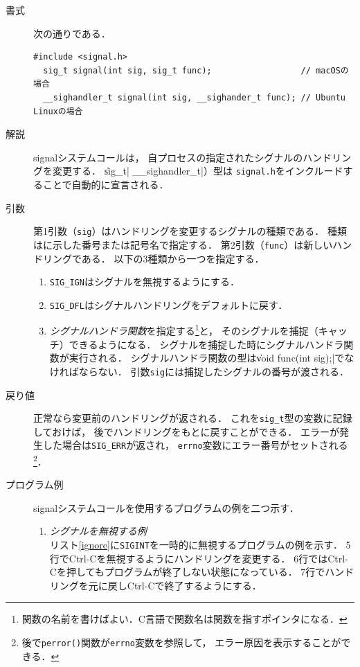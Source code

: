\begin{description}
\item[書式] 次の通りである．
\begin{lstlisting}[numbers=none]
  #include <signal.h>
  sig_t signal(int sig, sig_t func);                  // macOSの場合
  __sighandler_t signal(int sig, __sighander_t func); // Ubuntu Linuxの場合
\end{lstlisting}

\item[解説]
  signalシステムコールは，
  自プロセスの指定されたシグナルのハンドリングを変更する．
  \|sig_t|（\|__sighandler_t|）型は
  \texttt{signal.h}をインクルードすることで自動的に宣言される．

\item[引数]
  第1引数（\texttt{sig}）はハンドリングを変更するシグナルの種類である．
  種類はに示した番号または記号名で指定する．
  第2引数（\texttt{func}）は新しいハンドリングである．
  以下の3種類から一つを指定する．

  \begin{enumerate}
  \item \texttt{SIG\_IGN}はシグナルを無視するようにする．
  \item \texttt{SIG\_DFL}はシグナルハンドリングをデフォルトに戻す．
  \item \emph{シグナルハンドラ関数}を指定する\footnote{
    関数の名前を書けばよい．C言語で関数名は関数を指すポインタになる．}と，
    そのシグナルを捕捉（キャッチ）できるようになる．
    シグナルを捕捉した時にシグナルハンドラ関数が実行される．
    シグナルハンドラ関数の型は\|void func(int sig);|でなければならない．
    引数\texttt{sig}には捕捉したシグナルの番号が渡される．
  \end{enumerate}

\item[戻り値]
  正常なら変更前のハンドリングが返される．
  これを\texttt{sig\_t}型の変数に記録しておけば，
  後でハンドリングをもとに戻すことができる．
  エラーが発生した場合は\texttt{SIG\_ERR}が返され，
  \texttt{errno}変数にエラー番号がセットされる\footnote{
    後で\texttt{perror()}関数が\texttt{errno}変数を参照して，
    エラー原因を表示することができる．}．

\item[プログラム例] signalシステムコールを使用するプログラムの例を二つ示す．
  \begin{enumerate}
  \item \emph{シグナルを無視する例} \\
    リスト\ref{ignore}に\texttt{SIGINT}を一時的に無視するプログラムの例を示す．
    5行でCtrl-Cを無視するようにハンドリングを変更する．
    6行ではCtrl-Cを押してもプログラムが終了しない状態になっている．
    7行でハンドリングを元に戻しCtrl-Cで終了するようにする．


\end{enumerate}
\end{description}
